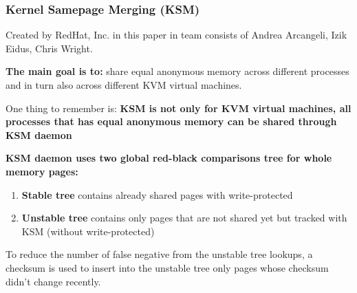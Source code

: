 \subsubsection{Kernel Samepage Merging (KSM)}

Created by RedHat, Inc. in this paper \cite{arcangeli_andrea_edius_ksm_2009}
in team consists of Andrea Arcangeli, Izik Eidus, Chris Wright.

\textbf{The main goal is to:} share equal anonymous memory across different processes and in turn also across different KVM virtual machines.

One thing to remember is: \textbf{KSM is not only for KVM virtual machines, all processes that has equal anonymous memory can be shared through KSM daemon}


\textbf{KSM daemon uses two  global red-black comparisons tree for whole memory pages:}
\begin{enumerate}
\item \textbf{Stable tree} contains already shared pages with write-protected
\item \textbf{Unstable tree} contains only pages that are not shared yet but tracked with KSM (without write-protected)
\end{enumerate}

To reduce the number of false negative from the unstable tree lookups, a checksum is used to insert into the unstable tree only pages whose checksum didn’t change recently.

